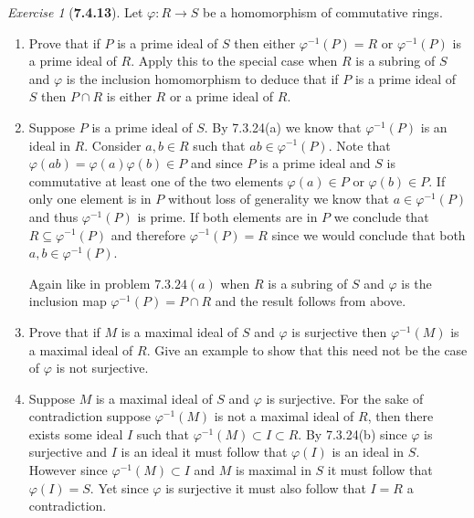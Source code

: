 \documentclass[12pt]{amsart}
\makeatletter
\theoremstyle{remark}
\newtheorem*{exercise}{Exercise}%
\renewenvironment{proof}[1][\proofname]{\par\doublespacing
  \pushQED{\qed}%
  \normalfont \topsep6\p@\@plus6\p@\relax
  \list{}{%
    \settowidth{\leftmargin}{\itshape\proofname:\hskip\labelsep}%
    \setlength{\labelwidth}{0pt}%
    \setlength{\itemindent}{-\leftmargin}%
  }%
  \item[\hskip\labelsep\itshape#1\@addpunct{:}]\ignorespaces
}{%
  \popQED\endlist\@endpefalse
  \singlespacing
}
\theoremstyle{mycomment}
\makeatother
\begin{document}
\begin{exercise}[\textbf{7.4.13}]  Let $\varphi: R \to S$ be a homomorphism of commutative rings.\\
  \begin{enumerate}
    \item[a] Prove that if $P$ is a prime ideal of $S$ then either $\varphi^{-1}(P) = R$ or $\varphi^{-1}(P)$ is a prime ideal of $R$. Apply this to 
    the special case when $R$ is a subring of $S$ and $\varphi$ is the inclusion homomorphism to deduce that if $P$ is a prime ideal of $S$ then 
    $P \cap R$ is either $R$ or a prime ideal of $R$. 
    \begin{proof} Suppose $P$ is a prime ideal of $S$. By 7.3.24(a) we know that $\varphi^{-1}(P)$ is an ideal in $R$. Consider $a, b \in R$ such that $ab \in \varphi^{-1}(P)$. 
      Note that $\varphi(ab) = \varphi(a)\varphi(b) \in P$ and since $P$ is a prime ideal and $S$ is commutative at least one of the two elements $\varphi(a) \in P$ or $\varphi(b) \in P$.
      If only one element is in $P$ without loss of generality we know that $a \in \varphi^{-1}(P)$ and thus $\varphi^{-1}(P)$ is prime. If both elements are in $P$ we conclude that 
      $R \subseteq \varphi^{-1}(P)$ and therefore $\varphi^{-1}(P) = R$ since we would conclude that both $a, b \in \varphi^{-1}(P)$.

      Again like in problem $7.3.24(a)$ when $R$ is a subring of $S$ and $\varphi$ is the inclusion map $\varphi^{-1}(P) = P \cap R$ and the result follows from above. 
    \end{proof}
\vspace{.15in}

    \item[b]Prove that if $M$ is a maximal ideal of $S$ and $\varphi$ is surjective then $\varphi^{-1}(M)$ is a maximal ideal of $R$. Give an example to show that this need not be the case of $\varphi$ is not surjective. 
     \begin{proof} Suppose $M$ is a maximal ideal of $S$ and $\varphi$ is surjective. For the sake of contradiction suppose $\varphi^{-1}(M)$ is not a maximal ideal of $R$, then there exists some 
      ideal $I$ such that $\varphi^{-1}(M) \subset I \subset R$. By 7.3.24(b) since $\varphi$ is surjective and $I$ is an ideal it must follow that $\varphi(I)$ is an ideal in $S$. However since 
      $\varphi^{-1}(M) \subset I$ and $M$ is maximal in $S$ it must follow that $\varphi(I) = S$. Yet since $\varphi$ is surjective it must also follow that $I = R$ a contradiction. 

    \end{proof}

  \end{enumerate}

\end{exercise}
\vspace{.5in}
\end{document}

